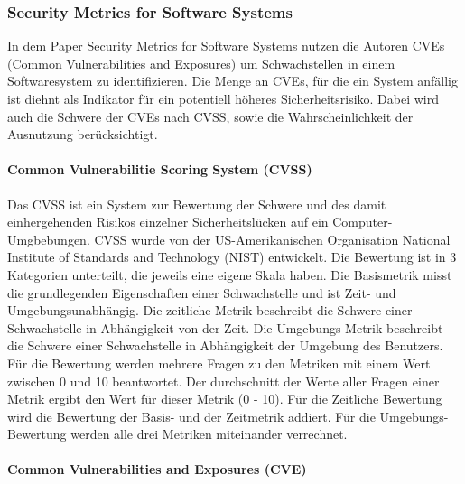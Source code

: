 \documentclass[12pt, a4paper, ngerman]{article}
\begin{document}
\subsubsection{Security Metrics for Software Systems~\cite{Wang_Wang_Guo_Xia_2009}}

In dem Paper Security Metrics for Software Systems nutzen die Autoren CVEs (Common Vulnerabilities and Exposures) 
um Schwachstellen in einem Softwaresystem zu identifizieren. 
Die Menge an CVEs, für die ein System anfällig ist diehnt als Indikator für ein potentiell höheres Sicherheitsrisiko.
Dabei wird auch die Schwere der CVEs nach CVSS, sowie die Wahrscheinlichkeit der Ausnutzung berücksichtigt.

\paragraph{Common Vulnerabilitie Scoring System (CVSS)}

Das CVSS ist ein System zur Bewertung der Schwere und 
des damit einhergehenden Risikos einzelner Sicherheitslücken auf ein Computer-Umgbebungen.
CVSS wurde von der US-Amerikanischen Organisation National Institute of Standards and Technology (NIST) entwickelt.
Die Bewertung ist in  3 Kategorien unterteilt, die jeweils eine eigene Skala haben.
Die Basismetrik misst die grundlegenden Eigenschaften einer Schwachstelle und ist Zeit- und Umgebungsunabhängig.
Die zeitliche Metrik beschreibt die Schwere einer Schwachstelle in Abhängigkeit von der Zeit.
Die Umgebungs-Metrik beschreibt die Schwere einer Schwachstelle in Abhängigkeit der Umgebung des Benutzers.
Für die Bewertung werden mehrere Fragen zu den Metriken mit einem Wert zwischen 0 und 10 beantwortet.
Der durchschnitt der Werte aller Fragen einer Metrik ergibt den Wert für dieser Metrik (0 - 10).
Für die Zeitliche Bewertung wird die Bewertung der Basis- und der Zeitmetrik addiert.
Für die Umgebungs-Bewertung werden alle drei Metriken miteinander verrechnet.

\paragraph{Common Vulnerabilities and Exposures (CVE)}
\end{document}
